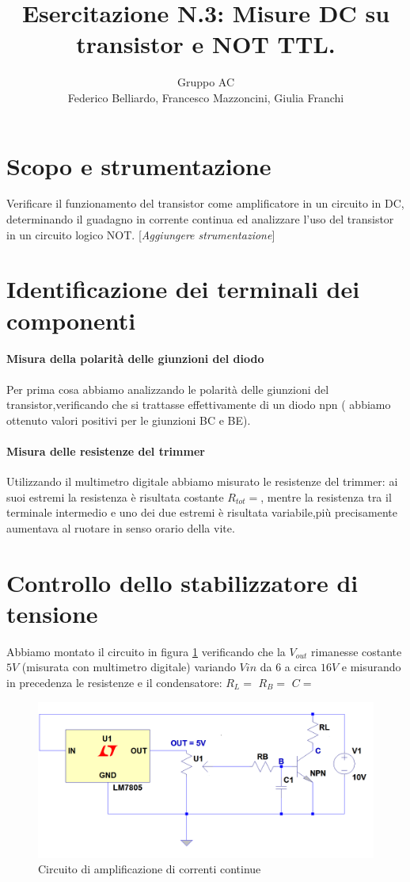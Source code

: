 \documentclass[10pt,a4paper]{article}
\author{Gruppo AC \\ Federico Belliardo, Francesco Mazzoncini, Giulia Franchi}
\title{Esercitazione N.3: Misure DC su transistor e NOT TTL.}
\newcommand{\rem}[1]{[\emph{#1}]}
\begin{document}
\maketitle
\section{Scopo e strumentazione}
Verificare il funzionamento del transistor come amplificatore in un circuito in DC, determinando il guadagno in corrente continua ed analizzare l'uso del transistor in un circuito logico NOT.
\rem{Aggiungere strumentazione}

\section{Identificazione dei terminali dei componenti}

\paragraph{Misura della polarità delle giunzioni del diodo}
Per prima cosa abbiamo analizzando le polarità delle giunzioni del transistor,verificando che si trattasse effettivamente  di un diodo npn ( abbiamo ottenuto valori positivi per le giunzioni BC e BE).
\paragraph{Misura delle resistenze del trimmer}
Utilizzando il multimetro digitale abbiamo misurato le resistenze del trimmer: ai suoi estremi la resistenza è risultata costante $R_{tot}=$, mentre la resistenza tra il terminale intermedio e uno dei due estremi è risultata variabile,più precisamente aumentava  al ruotare in senso orario della vite.
\section{Controllo dello stabilizzatore di tensione}
Abbiamo montato il circuito in  figura \ref{circuito} verificando che  la $V_{out}$ rimanesse costante $5V$ (misurata con multimetro digitale) variando $V{in}$ da 6 a circa  $16V$ e misurando in precedenza le resistenze e il condensatore: $R_L=$  $R_B=$  $C=$
\begin{figure}[!htb]
  \centering
  \includegraphics[scale=0.4]{circuito}
\caption{Circuito di amplificazione di correnti continue}
\label{circuito}
\end{figure}
\end{document}
